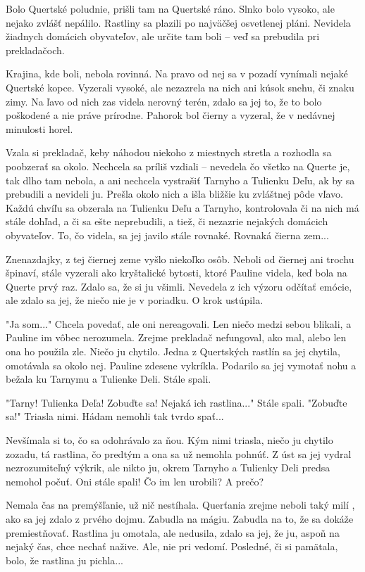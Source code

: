 \documentclass{book}
\begin{document}
Bolo Quertské poludnie, prišli tam na Quertské ráno. Slnko bolo vysoko, ale nejako zvlášť nepálilo. Rastliny sa plazili po najväčšej osvetlenej pláni. Nevidela žiadnych domácich obyvateľov, ale určite tam boli – veď sa prebudila pri prekladačoch.

Krajina, kde boli, nebola rovinná. Na pravo od nej sa v pozadí vynímali nejaké Quertské kopce. Vyzerali vysoké, ale nezazrela na nich ani kúsok snehu, či znaku zimy. Na ľavo od nich zas videla nerovný terén, zdalo sa jej to, že to bolo poškodené a nie práve prírodne. Pahorok bol čierny a vyzeral, že v nedávnej minulosti horel.

Vzala si prekladač, keby náhodou niekoho z miestnych stretla a rozhodla sa poobzerať sa okolo. Nechcela sa príliš vzdiali – nevedela čo všetko na Querte je, tak dlho tam nebola, a ani nechcela vystrašiť Tarnyho a Tulienku Deľu, ak by sa prebudili a nevideli ju. Prešla okolo nich a išla bližšie ku zvláštnej pôde vľavo. Každú chvíľu sa obzerala na Tulienku Deľu a Tarnyho, kontrolovala či na nich má stále dohľad, a či sa ešte neprebudili, a tiež, či nezazrie nejakých domácich obyvateľov. To, čo videla, sa jej javilo stále rovnaké. Rovnaká čierna zem...

Znenazdajky, z tej čiernej zeme vyšlo niekoľko osôb. Neboli od čiernej ani trochu špinaví, stále vyzerali ako kryštalické bytosti, ktoré Pauline videla, keď bola na Querte prvý raz. Zdalo sa, že si ju všimli. Nevedela z ich výzoru odčítať emócie, ale zdalo sa jej, že niečo nie je v poriadku. O krok ustúpila.

"$ $Ja som..."$ $ Chcela povedať, ale oni nereagovali. Len niečo medzi sebou blikali, a Pauline im vôbec nerozumela. Zrejme prekladač nefungoval, ako mal, alebo len ona ho použila zle. Niečo ju chytilo. Jedna z Quertských rastlín sa jej chytila, omotávala sa okolo nej. Pauline zdesene vykríkla. Podarilo sa jej vymotať nohu a bežala ku Tarnymu a Tulienke Deli. Stále spali.

"$ $Tarny! Tulienka Deľa! Zobuďte sa! Nejaká ich rastlina..."$ $ Stále spali. "$ $Zobuďte sa!"$ $ Triasla nimi. Hádam nemohli tak tvrdo spať...

Nevšímala si to, čo sa odohrávalo za ňou. Kým nimi triasla, niečo ju chytilo zozadu, tá rastlina, čo predtým a ona sa už nemohla pohnúť. Z úst sa jej vydral nezrozumiteľný výkrik, ale nikto ju, okrem Tarnyho a Tulienky Deli predsa nemohol počuť. Oni stále spali! Čo im len urobili? A prečo?

Nemala čas na premýšľanie, už nič nestíhala. Querťania zrejme neboli taký milí , ako sa jej zdalo z prvého dojmu. Zabudla na mágiu. Zabudla na to, že sa dokáže premiestňovať. Rastlina ju omotala, ale nedusila, zdalo sa jej, že ju, aspoň na nejaký čas, chce nechať nažive. Ale, nie pri vedomí. Posledné, či si pamätala, bolo, že rastlina ju pichla...
\end{document}
